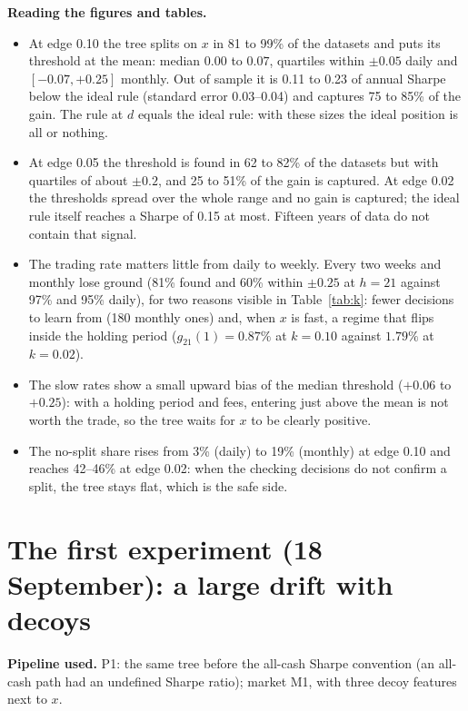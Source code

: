 \documentclass[11pt,a4paper]{article}
\newcommand{\1}{\mathbf{1}}
\begin{document}
\textbf{Reading the figures and tables.}
\begin{itemize}\setlength{\itemsep}{1pt}
\item At edge 0.10 the tree splits on $x$ in 81 to 99\% of the datasets and puts its threshold at the mean: median $0.00$ to $0.07$, quartiles within $\pm0.05$ daily and $[-0.07,+0.25]$ monthly. Out of sample it is 0.11 to 0.23 of annual Sharpe below the ideal rule (standard error 0.03--0.04) and captures 75 to 85\% of the gain. The rule at $d$ equals the ideal rule: with these sizes the ideal position is all or nothing.
\item At edge 0.05 the threshold is found in 62 to 82\% of the datasets but with quartiles of about $\pm0.2$, and 25 to 51\% of the gain is captured. At edge 0.02 the thresholds spread over the whole range and no gain is captured; the ideal rule itself reaches a Sharpe of 0.15 at most. Fifteen years of data do not contain that signal.
\item The trading rate matters little from daily to weekly. Every two weeks and monthly lose ground (81\% found and 60\% within $\pm0.25$ at $h=21$ against 97\% and 95\% daily), for two reasons visible in Table~\ref{tab:k}: fewer decisions to learn from (180 monthly ones) and, when $x$ is fast, a regime that flips inside the holding period ($g_{21}(1)=0.87\%$ at $k=0.10$ against $1.79\%$ at $k=0.02$).
\item The slow rates show a small upward bias of the median threshold ($+0.06$ to $+0.25$): with a holding period and fees, entering just above the mean is not worth the trade, so the tree waits for $x$ to be clearly positive.
\item The no-split share rises from 3\% (daily) to 19\% (monthly) at edge 0.10 and reaches 42--46\% at edge 0.02: when the checking decisions do not confirm a split, the tree stays flat, which is the safe side.
\end{itemize}

\section{The first experiment (18 September): a large drift with decoys}\label{sec:first}
\textbf{Pipeline used.} P1: the same tree before the all-cash Sharpe convention (an all-cash path had an undefined Sharpe ratio); market M1, with three decoy features next to $x$.
\end{document}
